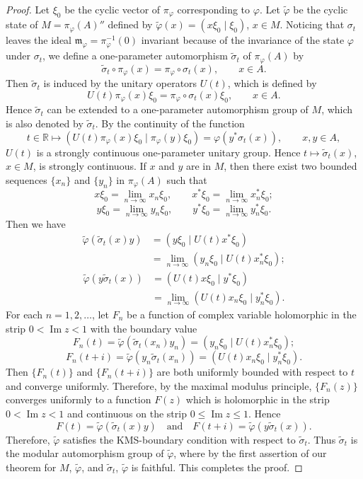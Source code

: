 \documentclass[12pt,b5paper,twoside]{article}
\theoremstyle{takesaki}
\numberwithin{equation}{section}
\begin{document}
\begin{proof}
Let $\xi_0$ be the cyclic vector of $\pi_\varphi$ corresponding to
$\varphi$.  Let $\widetilde\varphi$ be the cyclic state of
$M=\pi_\varphi(A)''$ defined by
$\widetilde\varphi(x)=(x\xi_0\mid\xi_0)$, $x\in M$.  Noticing that
$\sigma_t$ leaves the ideal
$\mathfrak m_\varphi=\pi_\varphi^{-1}(0)$ invariant because of the
invariance of the state $\varphi$ under $\sigma_t$, we define a
one-parameter automorphism $\widetilde\sigma_t$ of $\pi_\varphi(A)$
by
\[
 \widetilde\sigma_t\circ\pi_\varphi(x)
 =\pi_\varphi\circ\sigma_t(x),
 \qquad x\in A.
\]
Then $\widetilde\sigma_t$ is induced by the unitary operators $U(t)$,
which is defined by
\[
 U(t)\pi_\varphi(x)\xi_0
 =\pi_\varphi\circ\sigma_t(x)\xi_0,
 \qquad x\in A.
\]
Hence $\widetilde\sigma_t$ can be extended to a one-parameter
automorphism group of $M$, which is also denoted by
$\widetilde\sigma_t$.  By the continuity of the function
\[
 t\in\mathbb R\longmapsto
 (U(t)\pi_\varphi(x)\xi_0\mid\pi_\varphi(y)\xi_0)
 =\varphi(y^*\sigma_t(x)),
 \qquad x,y\in A,
\]
$U(t)$ is a strongly continuous one-parameter unitary group.  Hence
$t\mapsto\widetilde\sigma_t(x)$, $x\in M$, is strongly continuous.
If $x$ and $y$ are in $M$, then there exist two bounded sequences
$\{x_n\}$ and $\{y_n\}$ in $\pi_\varphi(A)$ such that
\[
 x\xi_0=\lim_{n\to\infty}x_n\xi_0,
 \qquad
 x^*\xi_0=\lim_{n\to\infty}x_n^*\xi_0;
\]
\[
 y\xi_0=\lim_{n\to\infty}y_n\xi_0,
 \qquad
 y^*\xi_0=\lim_{n\to\infty}y_n^*\xi_0.
\]
Then we have
\begin{align*}
 \widetilde\varphi(\widetilde\sigma_t(x)y)
 &=(y\xi_0\mid U(t)x^*\xi_0)\\
 &=\lim_{n\to\infty}(y_n\xi_0\mid U(t)x_n^*\xi_0);
\end{align*}
\begin{align*}
 \widetilde\varphi(y\widetilde\sigma_t(x))
 &=(U(t)x\xi_0\mid y^*\xi_0)\\
 &=\lim_{n\to\infty}(U(t)x_n\xi_0\mid y_n^*\xi_0).
\end{align*}
For each $n=1,2,\ldots$, let $F_n$ be a function of complex variable
holomorphic in the strip $0<\operatorname{Im}z<1$ with the boundary
value
\[
 F_n(t)=\widetilde\varphi(\widetilde\sigma_t(x_n)y_n)
 =(y_n\xi_0\mid U(t)x_n^*\xi_0);
\]
\[
 F_n(t+i)=\widetilde\varphi(y_n\widetilde\sigma_t(x_n))
 =(U(t)x_n\xi_0\mid y_n^*\xi_0).
\]
Then $\{F_n(t)\}$ and $\{F_n(t+i)\}$ are both uniformly bounded
with respect to $t$ and converge uniformly.  Therefore, by the
maximal modulus principle, $\{F_n(z)\}$ converges uniformly to a
function $F(z)$ which is holomorphic in the strip
$0<\operatorname{Im}z<1$ and continuous on the strip
$0\leq\operatorname{Im}z\leq1$.  Hence
\[
 F(t)=\widetilde\varphi(\widetilde\sigma_t(x)y)
 \quad\text{and}\quad
 F(t+i)=\widetilde\varphi(y\widetilde\sigma_t(x)).
\]
Therefore, $\widetilde\varphi$ satisfies the KMS-boundary condition
with respect to $\widetilde\sigma_t$.  Thus
$\widetilde\sigma_t$ is the modular automorphism group of
$\widetilde\varphi$, where by the first assertion of our theorem for
$M$, $\widetilde\varphi$, and $\widetilde\sigma_t$,
$\widetilde\varphi$ is faithful.  This completes the proof.
\end{proof}
\end{document}
